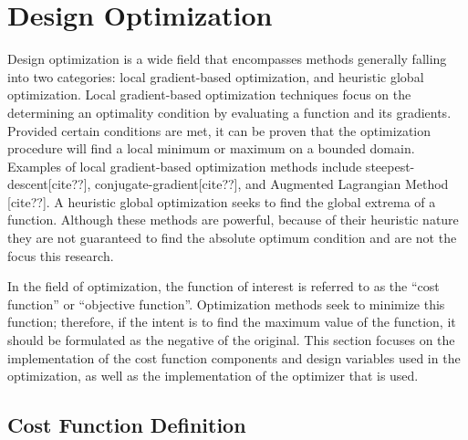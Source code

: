 \chapter{Design Optimization}
\label{chapter-five}

Design optimization is a wide field that encompasses methods generally falling into
two categories: local gradient-based optimization, and heuristic global
optimization.  Local gradient-based optimization techniques focus on the
determining an optimality condition by evaluating a function and its gradients.
Provided certain conditions are met, it can be proven that the optimization
procedure will find a local minimum or maximum on a bounded domain.  Examples of
local gradient-based optimization methods include steepest-descent[cite??],
conjugate-gradient[cite??], and Augmented Lagrangian Method [cite??].  A
heuristic global optimization seeks to find the global extrema of a function.
Although these methods are powerful, because of their heuristic nature they are
not guaranteed to find the absolute optimum condition and are not the focus this
research.

In the field of optimization, the function of interest is referred to as the
``cost function'' or ``objective function''.  Optimization methods seek to
minimize this function; therefore, if the intent is to find the maximum value
of the function, it should be formulated as the negative of the original.  This
section focuses on the implementation of the cost function components and design
variables used in the optimization, as well as the implementation of the
optimizer that is used.

\section{Cost Function Definition}

